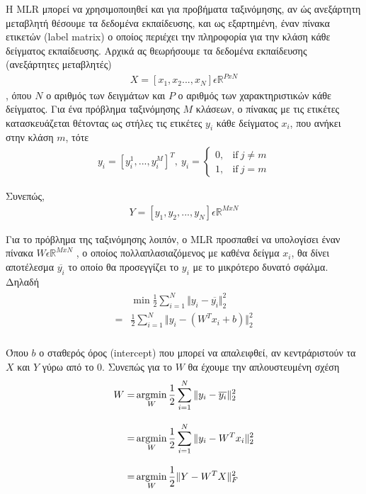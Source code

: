 \documentclass[11pt,a4paper,english,greek,twoside]{../Thesis}
\begin{document}
\par Η MLR μπορεί να χρησιμοποιηθεί και για προβήματα ταξινόμησης, αν ώς ανεξάρτητη μεταβλητή θέσουμε τα δεδομένα εκπαίδευσης, και ως εξαρτημένη, έναν πίνακα ετικετών (label matrix) ο οποίος περιέχει την πληροφορία για την κλάση κάθε δείγματος εκπαίδευσης. Αρχικά ας θεωρήσουμε τα δεδομένα εκπαίδευσης (ανεξάρτητες μεταβλητές) 
\begin{align}
X=[x_1,x_2...,x_N] \epsilon \mathbb{R}^{PxN}
\end{align}
, όπου $N$ ο αριθμός των δειγμάτων και $P$ ο αριθμός των χαρακτηριστικών κάθε δείγματος. Για ένα πρόβλημα ταξινόμησης $M$ κλάσεων, ο πίνακας με τις ετικέτες κατασκευάζεται θέτοντας ως στήλες τις ετικέτες $y_i$ κάθε δείγματος $x_i$, που ανήκει στην κλάση $m$, τότε 
\begin{align}
    y_i=[y_i^1,...,y_i^M]^T
    , \  
    y_i=
    \begin{cases}
      0, & \text{if}\ j\neq m \\
      1, & \text{if}\ j=m
    \end{cases}
    \label{eqMLR1}
  \end{align}
\par 
Συνεπώς, 
\begin{align}
Y=[y_1,y_2,...,y_N] \epsilon \mathbb{R}^{MxN}
\end{align}
\par Για το πρόβλημα της ταξινόμησης λοιπόν, ο MLR προσπαθεί να υπολογίσει έναν πίνακα $W \epsilon \mathbb{R}^{MxN}$ , ο οποίος πολλαπλασιαζόμενος με καθένα δείγμα $x_i$, θα δίνει αποτέλεσμα $\overline{y_i}$ το οποίο θα προσεγγίζει το $y_i$ με το μικρότερο δυνατό σφάλμα. Δηλαδή
\begin{align}
\begin{split}
&\min \frac{1}{2}\sum_{i=1}^{N}\Vert y_i-\overline{y_i}\Vert_2^2 \\[2ex]
=&\frac{1}{2}\sum_{i=1}^{N}\Vert y_i-(W^Tx_i+b)\Vert_2^2 \\[2ex]
\label{eqMLR2}
\end{split}
\end{align}
\par Όπου $b$ ο σταθερός όρος (intercept) που μπορεί να απαλειφθεί, αν κεντράριστούν τα $X$ και $Y$ γύρω από το 0. Συνεπώς για το $W$ θα έχουμε την απλουστευμένη σχέση
\begin{align}
\begin{split}
W=&\operatorname*{argmin}_W \frac{1}{2}\sum_{i=1}^{N}\Vert y_i-\overline{y_i}\Vert_2^2 \\[2ex]
=&\operatorname*{argmin}_W\frac{1}{2}\sum_{i=1}^{N}\Vert y_i-W^Tx_i\Vert_2^2 \\[2ex]
=&\operatorname*{argmin}_W\frac{1}{2}\Vert Y-W^TX\Vert_F^2
\label{eqMLR3}
\end{split}
\end{align}
\end{document}
